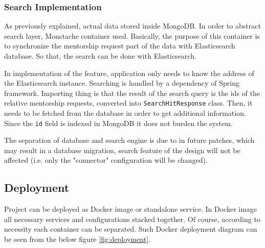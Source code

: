 \documentclass[10pt]{article}
\begin{document}
\subsubsection{Search Implementation}
As previously explained, actual data stored inside MongoDB. In order to abstract search layer,
Monstache container used. Basically, the purpose of this container is to synchronize the
mentorship request part of the data with Elasticsearch database. So that, the search can be
done with Elasticsearch.

In implementation of the feature, application only needs to know the address of the Elasticsearch
instance. Searching is handled by a dependency of Spring framework. Importing thing is that the
result of the search query is the ids of the relative mentorship requests, converted into
\texttt{SearchHitResponse} class. Then, it needs to be fetched from the database in order to get
additional information. Since the \texttt{id} field is indexed in MongoDB it does not burden the
system.

The separation of database and search engine is due to in future patches, which may
result in a database migration, search feature of the design will not be affected 
(i.e. only the "connector" configuration will be changed).


\subsection{Deployment} \label{deployment}
Project can be deployed as Docker image or standalone service. In Docker image all necessary
services and configurations stacked together. Of course, according to necessity each container
can be separated. Such Docker deployment diagram can be seen from the below figure
\ref{fig:deployment}.
\end{document}
